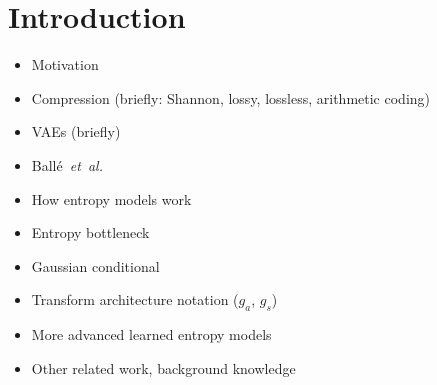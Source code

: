 \chapter{Introduction}
\label{chap:introduction}


\begin{itemize}
  \item Motivation
  \item Compression (briefly: Shannon, lossy, lossless, arithmetic coding)
  \item VAEs (briefly)
  \item Ballé~\emph{et~al.}~\cite{balle2018variational}
  \item How entropy models work
  \item Entropy bottleneck
  \item Gaussian conditional
  \item Transform architecture notation ($g_a$, $g_s$)
  \item More advanced learned entropy models
  \item Other related work, background knowledge
\end{itemize}

